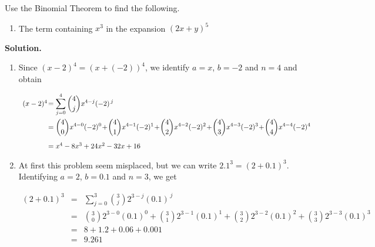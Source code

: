 \begin{ex} \label{binomialthmex}  Use the Binomial Theorem to find the following.

\begin{enumerate}


\item  The term containing $x^3$ in the expansion $(2x+y)^{5}$

\end{enumerate}

{\bf Solution.}
\begin{enumerate}
\item  Since $(x-2)^4 = (x+(-2))^4$, we identify $a = x$, $b = -2$ and $n=4$ and obtain

\[ \begin{array}{rcl}

(x-2)^4\! &\hspace{-.1in} =  & \hspace{-.1in}\displaystyle{\sum_{j=0}^{4} \binom{4}{j} x^{4-j} (-2)^{\, j}} \\ [15pt]
        & \hspace{-.1in} =  & \hspace{-.1in}\displaystyle{\binom{4}{0} x^{4-0} (-2)^{0} \!+\! \binom{4}{1} x^{4-1} (-2)^{1} \!+\! \binom{4}{2} x^{4-2} (-2)^{2} \!+\! \binom{4}{3} x^{4-3} (-2)^{3} \!+\! \binom{4}{4} x^{4-4} (-2)^{4}} \\ [15pt]
        &\hspace{-.1in}  =  & \hspace{-.1in}x^4 -8x^3 + 24x^2 - 32x + 16 \\
\end{array} \]

\item  At first this problem seem misplaced, but we can write $2.1^{3} = (2 + 0.1)^3$.  Identifying $a =2$, $b = 0.1$ and $n=3$, we get

\[ \begin{array}{rcl}

(2+0.1)^3 & = & \displaystyle{\sum_{j=0}^{3} \binom{3}{j} 2^{3-j} (0.1) ^{\, j}} \\ [15pt]
        & = & \displaystyle{\binom{3}{0} 2^{3-0}(0.1)^{0} + \binom{3}{1} 2^{3-1} (0.1)^{1} + \binom{3}{2} 2^{3-2}(0.1)^{2} + \binom{3}{3} 2^{3-3}(0.1)^{3}} \\ [15pt]
        & = & 8 + 1.2 + 0.06 + 0.001 \\
        & = & 9.261 \\
\end{array} \]


\end{enumerate}
\end{ex}
